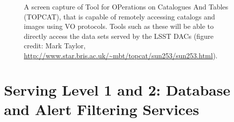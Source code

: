 \documentclass[DM,lsstdraft,toc]{lsstdoc}
\begin{document}
\begin{figure}
	\centering
	\caption{A screen capture of Tool for OPerations on Catalogues And Tables (TOPCAT), that is capable of remotely accessing catalogs and images using VO protocols. Tools such as these will be able to directly access the data sets served by the LSST DACs (figure credit: Mark Taylor, \url{http://www.star.bris.ac.uk/~mbt/topcat/sun253/sun253.html}).
		\label{fig:toolsTOPCAT}}
\end{figure}

\section{Serving Level 1 and 2: Database and Alert Filtering Services}
\end{document}
